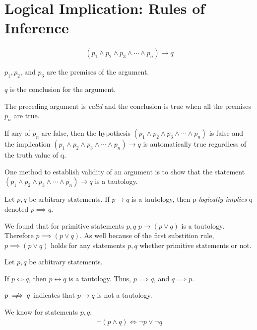 
%
\section{Logical Implication: Rules of Inference}
    
\begin{align*}
    (p_1 \land p_2 \land p_3 \land \cdots \land p_n) \to q
\end{align*}

$p_1, p_2$, and $p_3$ are the premises of the argument.

$q$ is the conclusion for the argument.

The preceding argument is \textit{valid} and the conclusion is true when all the premises $p_n$ are true.

If any of $p_n$ are false, then the hypothesis $(p_1 \land p_2 \land p_3 \land \cdots \land p_n)$ is false
and the implication $(p_1 \land p_2 \land p_3 \land \cdots \land p_n) \to q$ is automatically true
regardless of the truth value of q.

One method to establish validity of an argument is to show that 
the statement $(p_1 \land p_2 \land p_3 \land \cdots \land p_n) \to q$ is a tautology.

\begin{definition}
    Let $p,q$ be arbitrary statements. If $p \to q$ is a tautology, then
    p \textit{logically implies} q denoted $p \implies q$.
\end{definition}

We found that for primitive statements $p, q$ $p \to (p \lor q)$ is a tautology.
Therefore $p \implies (p \lor q)$. As well because of the first substition rule,
$p \implies (p \lor q)$ holds for any statements $p, q$ whether primitive statements or not.

Let $p, q$ be arbitrary statements.

If $p \iff q$, then $p \leftrightarrow q$ is a tautology. Thus, $p \implies q$, and $q \implies p$.

$p \centernot\implies q$ indicates that $p \to q$ is not a tautology.

We know for statements $p, q$,
\begin{align*}
    \neg (p \land q) \iff \neg p \lor \neg q
\end{align*}

%
